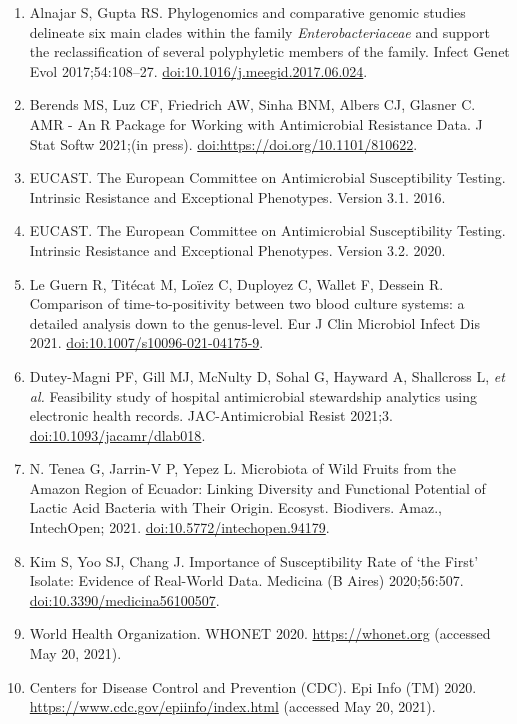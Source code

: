 \documentclass[
]{book}
\begin{document}
\begin{enumerate}
\item
  Alnajar S, Gupta RS. Phylogenomics and comparative genomic studies delineate six main clades within the family \emph{Enterobacteriaceae} and support the reclassification of several polyphyletic members of the family. Infect Genet Evol 2017;54:108--27. \url{doi:10.1016/j.meegid.2017.06.024}.
\item
  Berends MS, Luz CF, Friedrich AW, Sinha BNM, Albers CJ, Glasner C. AMR - An R Package for Working with Antimicrobial Resistance Data. J Stat Softw 2021;(in press). \url{doi:https://doi.org/10.1101/810622}.
\item
  EUCAST. The European Committee on Antimicrobial Susceptibility Testing. Intrinsic Resistance and Exceptional Phenotypes. Version 3.1. 2016.
\item
  EUCAST. The European Committee on Antimicrobial Susceptibility Testing. Intrinsic Resistance and Exceptional Phenotypes. Version 3.2. 2020.
\item
  Le Guern R, Titécat M, Loïez C, Duployez C, Wallet F, Dessein R. Comparison of time-to-positivity between two blood culture systems: a detailed analysis down to the genus-level. Eur J Clin Microbiol Infect Dis 2021. \url{doi:10.1007/s10096-021-04175-9}.
\item
  Dutey-Magni PF, Gill MJ, McNulty D, Sohal G, Hayward A, Shallcross L, \emph{et al.} Feasibility study of hospital antimicrobial stewardship analytics using electronic health records. JAC-Antimicrobial Resist 2021;3. \url{doi:10.1093/jacamr/dlab018}.
\item
  N. Tenea G, Jarrin-V P, Yepez L. Microbiota of Wild Fruits from the Amazon Region of Ecuador: Linking Diversity and Functional Potential of Lactic Acid Bacteria with Their Origin. Ecosyst. Biodivers. Amaz., IntechOpen; 2021. \url{doi:10.5772/intechopen.94179}.
\item
  Kim S, Yoo SJ, Chang J. Importance of Susceptibility Rate of `the First' Isolate: Evidence of Real-World Data. Medicina (B Aires) 2020;56:507. \url{doi:10.3390/medicina56100507}.
\item
  World Health Organization. WHONET 2020. \url{https://whonet.org} (accessed May 20, 2021).
\item
  Centers for Disease Control and Prevention (CDC). Epi Info (TM) 2020. \url{https://www.cdc.gov/epiinfo/index.html} (accessed May 20, 2021).
\end{enumerate}

  
\end{document}
